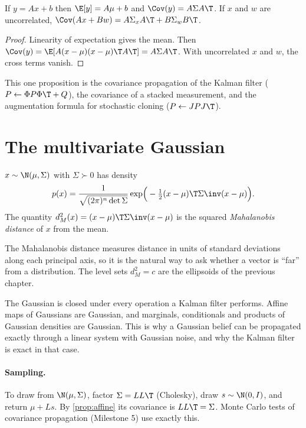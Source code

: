 \begin{proposition}
\label{prop:affine}
If $y = Ax + b$ then $\E[y] = A\mu + b$ and $\Cov(y) = A\Sigma A\T$. If $x$ and $w$ are uncorrelated,
$\Cov(Ax + Bw) = A\Sigma_x A\T + B\Sigma_w B\T$.
\end{proposition}
\begin{proof}
Linearity of expectation gives the mean. Then
$\Cov(y) = \E[A(x - \mu)(x - \mu)\T A\T] = A\Sigma A\T$. With uncorrelated $x$ and $w$, the cross terms
vanish.
\end{proof}

This one proposition is the covariance propagation of the Kalman filter
($P \leftarrow \Phi P \Phi\T + Q$), the covariance of a stacked measurement, and the augmentation
formula for stochastic cloning ($P \leftarrow JPJ\T$).

\section{The multivariate Gaussian}

\begin{definition}
$x \sim \N(\mu, \Sigma)$ with $\Sigma \succ 0$ has density
\begin{equation}
  p(x) = \frac{1}{\sqrt{(2\pi)^n \det\Sigma}}
         \exp\!\Big( -\tfrac12 (x - \mu)\T \Sigma\inv (x - \mu) \Big).
\end{equation}
The quantity $d_M^2(x) = (x - \mu)\T\Sigma\inv(x-\mu)$ is the squared \emph{Mahalanobis distance}
of $x$ from the mean.
\end{definition}

The Mahalanobis distance measures distance in units of standard deviations along each principal
axis, so it is the natural way to ask whether a vector is ``far'' from a distribution. The level
sets $d_M^2 = c$ are the ellipsoids of the previous chapter.

The Gaussian is closed under every operation a Kalman filter performs. Affine maps of Gaussians are
Gaussian, and marginals, conditionals and products of Gaussian densities are Gaussian. This is
why a Gaussian belief can be propagated exactly through a linear system with Gaussian noise, and
why the Kalman filter is exact in that case.

\paragraph{Sampling.} To draw from $\N(\mu,\Sigma)$, factor $\Sigma = LL\T$ (Cholesky), draw
$s \sim \N(0, I)$, and return $\mu + L s$. By \cref{prop:affine} its covariance is $LL\T = \Sigma$.
Monte Carlo tests of covariance propagation (Milestone 5) use exactly this.


